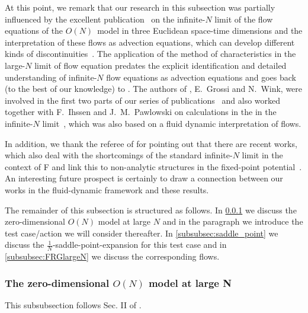 At this point, we remark that our research in this subsection was partially influenced by the excellent publication~\cite{Grossi:2019urj} on the infinite-$N$ limit of the \frg{}  flow equations of the $O(N)$~model in three Euclidean space-time dimensions and the interpretation of these \frg{} flows as advection equations, which can develop different kinds of discontinuities~\cite{Grossi:2019urj}. 
The application of the method of characteristics in the large-$N$ limit of \frg{}  flow equation predates the explicit identification and detailed understanding of infinite-$N$ \frg{} flow equations as advection equations and goes back (to the best of our knowledge) to .
The authors of , E.~Grossi and N.~Wink, were involved in the first two parts of our series of publications~\cite{Koenigstein:2021syz,Koenigstein:2021rxj} and also worked together with F.~Ihssen and J.~M.~Pawlowski on calculations in the \qmm{} in the infinite-$N$ limit~\cite{Grossi:2021ksl,Ihssen2020,Ihssen:2023xlp}, which was also based on a fluid dynamic interpretation of \frg{} flows.

In addition, we thank the referee of  for pointing out that there are recent works, which also deal with the shortcomings of the standard infinite-$N$ limit in the context of F\rg{} and link this to non-analytic structures in the fixed-point potential~\cite{Yabunaka:2018mju,Yabunaka:2021fow}.
An interesting future prospect is certainly to draw a connection between our works in the fluid-dynamic framework and these results.\bigskip

The remainder of this subsection is structured as follows.
In \cref{subsubsec:0dLargeNON} we discuss the zero-dimensional $O(N)$ model at large $N$ and in the paragraph  we introduce the test case/action we will consider thereafter.
In \cref{subsubsec:saddle_point} we discuss the $\frac{1}{N}$-saddle-point-expansion for this test case and in \cref{subsubsec:FRGlargeN} we discuss the corresponding \frg{} flows.

\clearpage
\subsubsection{The zero-dimensional \texorpdfstring{$O(N)$}{O(N)} model at large N}\label{subsubsec:0dLargeNON}
\begin{disclaimer}
	This subsubsection follows Sec. II of .
\end{disclaimer}
\vspace{-3em}%
